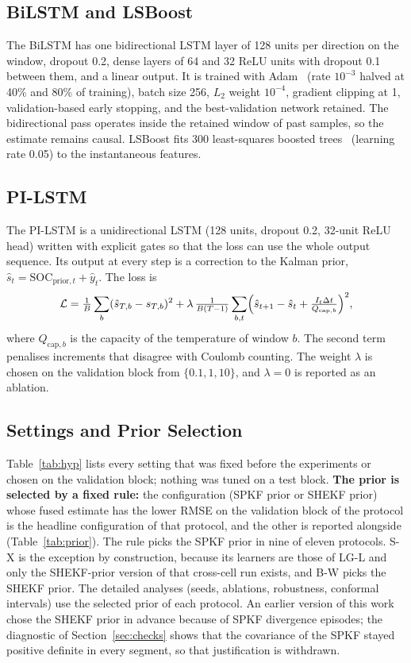\documentclass[journal]{IEEEtran}
\newcommand{\SOC}{\mathrm{SOC}}
\begin{document}
\subsection{BiLSTM and LSBoost}
The BiLSTM has one bidirectional LSTM layer of 128 units per direction on the window, dropout 0.2, dense layers of 64 and 32 ReLU units with dropout 0.1 between them, and a linear output. It is trained with Adam~\cite{kingma2015adam} (rate $10^{-3}$ halved at 40\% and 80\% of training), batch size 256, $L_2$ weight $10^{-4}$, gradient clipping at 1, validation-based early stopping, and the best-validation network retained. The bidirectional pass operates inside the retained window of past samples, so the estimate remains causal. LSBoost fits 300 least-squares boosted trees~\cite{friedman2001boost} (learning rate 0.05) to the instantaneous features.

\subsection{PI-LSTM}
The PI-LSTM is a unidirectional LSTM (128 units, dropout 0.2, 32-unit ReLU head) written with explicit gates so that the loss can use the whole output sequence. Its output at every step is a correction to the Kalman prior, $\hat s_t=\SOC_{\mathrm{prior},t}+\hat y_t$. The loss is
\begin{equation}
\mathcal L=\tfrac1B\sum_b(\hat s_{T,b}-s_{T,b})^2+\lambda\,\tfrac{1}{B(T-1)}\sum_{b,t}\Bigl(\hat s_{t+1}-\hat s_t+\tfrac{I_t\Delta t}{Q_{\mathrm{cap},b}}\Bigr)^{2},
\end{equation}
where $Q_{\mathrm{cap},b}$ is the capacity of the temperature of window $b$. The second term penalises increments that disagree with Coulomb counting. The weight $\lambda$ is chosen on the validation block from $\{0.1,1,10\}$, and $\lambda=0$ is reported as an ablation.

\subsection{Settings and Prior Selection}\label{sec:tuning}
Table~\ref{tab:hyp} lists every setting that was fixed before the experiments or chosen on the validation block; nothing was tuned on a test block. \textbf{The prior is selected by a fixed rule:} the configuration (SPKF prior or SHEKF prior) whose fused estimate has the lower RMSE on the validation block of the protocol is the headline configuration of that protocol, and the other is reported alongside (Table~\ref{tab:prior}). The rule picks the SPKF prior in nine of eleven protocols. S-X is the exception by construction, because its learners are those of LG-L and only the SHEKF-prior version of that cross-cell run exists, and B-W picks the SHEKF prior. The detailed analyses (seeds, ablations, robustness, conformal intervals) use the selected prior of each protocol. An earlier version of this work chose the SHEKF prior in advance because of SPKF divergence episodes; the diagnostic of Section~\ref{sec:checks} shows that the covariance of the SPKF stayed positive definite in every segment, so that justification is withdrawn.
\end{document}
